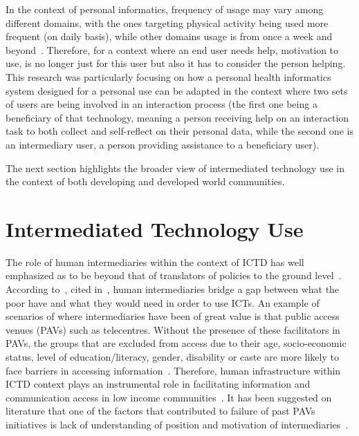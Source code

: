 In the context of personal informatics, frequency of usage may vary among different domains, with the ones targeting physical activity being used more frequent (on daily basis), while other domains usage is from once a week and beyond~\citep{epstein2015lived}. Therefore, for a context where an end user needs help, motivation to use, is no longer just for this user but also it has to consider the person helping. This research was particularly focusing on how a personal health informatics system  designed for a personal use can be adapted in the context where two sets of users are being involved in an interaction process (the first one being a beneficiary of that technology, meaning a person receiving help on an interaction task to both collect and self-reflect on their personal data, while the second one is an intermediary user, a person providing assistance to a beneficiary user). 

The next section highlights the broader view of intermediated technology use in the context of both developing and developed world communities.  

\section{Intermediated Technology Use}
The role of human intermediaries within the context of ICTD has well emphasized as to be beyond that of translators of policies to the ground level~\citep{bailur2010liminal}. According to~\cite{heeks1999tyranny}, cited in~\cite{bailur2012complex}, human intermediaries bridge a gap between what the poor have and what they would need in order to use ICTs. An example of scenarios of where intermediaries have been of great value is that public access venues (PAVs) such as telecentres. Without the presence of these facilitators in PAVs, the groups that are excluded from access due to their age, socio-economic status, level of education/literacy, gender, disability or caste are more likely to face barriers in accessing information~\citep{ramirez2013infomediaries}. Therefore, human infrastructure within ICTD context plays an instrumental role in facilitating information and communication access in low income communities~\citep{sambasivan2010human}.
It has been suggested on literature that one of the factors that contributed to failure of past PAVs initiatives is lack of understanding of position and motivation of intermediaries~\citep{bailur2010liminal}.
 
